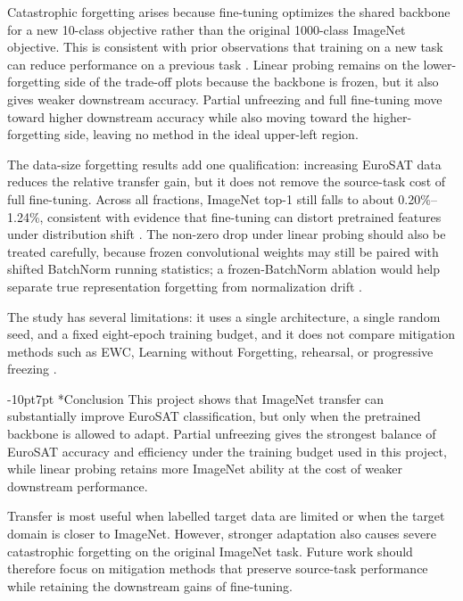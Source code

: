 \documentclass[10pt,twocolumn,letterpaper]{article}
\makeatletter
\def\cvprsection{\@startsection {section}{1}{\z@}
   {-10pt}{7pt} {\large\bfseries}}
\def\cvprssect#1{\cvprsection*{#1}}
\def\cvprsect#1{\cvprsection{\texorpdfstring{\hskip -1em.~}{}#1}}
\def\section{\@ifstar\cvprssect\cvprsect}
\makeatother
\begin{document}
Catastrophic forgetting arises because fine-tuning optimizes the shared backbone for a new 10-class objective rather than the original 1000-class ImageNet objective. This is consistent with prior observations that training on a new task can reduce performance on a previous task \cite{goodfellow2013}. Linear probing remains on the lower-forgetting side of the trade-off plots because the backbone is frozen, but it also gives weaker downstream accuracy. Partial unfreezing and full fine-tuning move toward higher downstream accuracy while also moving toward the higher-forgetting side, leaving no method in the ideal upper-left region.

The data-size forgetting results add one qualification: increasing EuroSAT data reduces the relative transfer gain, but it does not remove the source-task cost of full fine-tuning. Across all fractions, ImageNet top-1 still falls to about 0.20\%--1.24\%, consistent with evidence that fine-tuning can distort pretrained features under distribution shift \cite{kumar2022}. The non-zero drop under linear probing should also be treated carefully, because frozen convolutional weights may still be paired with shifted BatchNorm running statistics; a frozen-BatchNorm ablation would help separate true representation forgetting from normalization drift \cite{li2016adabn}.

The study has several limitations: it uses a single architecture, a single random seed, and a fixed eight-epoch training budget, and it does not compare mitigation methods such as EWC, Learning without Forgetting, rehearsal, or progressive freezing \cite{kirkpatrick2017,li2016}.

\section{Conclusion}
This project shows that ImageNet transfer can substantially improve EuroSAT classification, but only when the pretrained backbone is allowed to adapt. Partial unfreezing gives the strongest balance of EuroSAT accuracy and efficiency under the training budget used in this project, while linear probing retains more ImageNet ability at the cost of weaker downstream performance.

Transfer is most useful when labelled target data are limited or when the target domain is closer to ImageNet. However, stronger adaptation also causes severe catastrophic forgetting on the original ImageNet task. Future work should therefore focus on mitigation methods that preserve source-task performance while retaining the downstream gains of fine-tuning.
\end{document}

